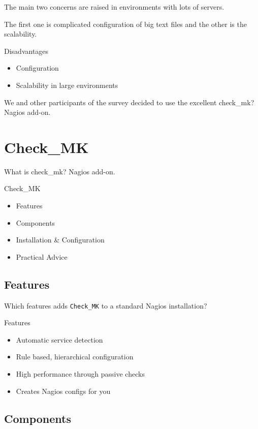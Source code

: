 The main two concerns are raised in environments with lots
of servers.

The first one is complicated configuration of big text files
and the other is the scalability.

\begin{frame}{Disadvantages}

\begin{itemize}
\item Configuration
\item Scalability in large environments
\end{itemize}
\end{frame}

We and other participants of the survey decided to use the excellent 
check\_mk? Nagios add-on.

\section{Check\_MK}

What is check\_mk? Nagios add-on.

\begin{frame}[fragile]{Check\_MK}
\begin{itemize}
\item Features
\item Components
\item Installation \& Configuration
\item Practical Advice
\end{itemize}
\end{frame}

\subsection{Features}

Which features adds \verb|Check_MK| to a standard Nagios installation?

\begin{frame}[fragile]{Features}
\begin{itemize}
\item Automatic service detection
\item Rule based, hierarchical configuration
\item High performance through passive checks
\item Creates Nagios configs for you
\end{itemize}
\end{frame}

\subsection{Components}


